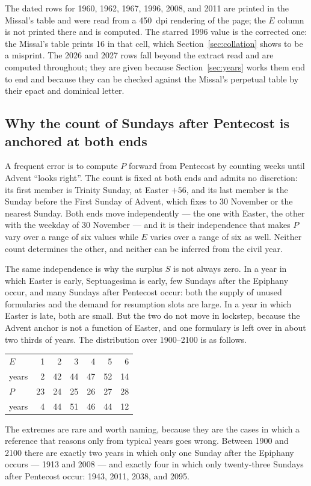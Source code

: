 The dated rows for 1960, 1962, 1967, 1996, 2008, and 2011 are printed in the Missal's table and
were read from a 450~dpi rendering of the page; the $E$ column is not printed there and is
computed. The starred 1996 value is the corrected one: the Missal's table prints 16 in that
cell, which Section~\ref{sec:collation} shows to be a misprint. The 2026 and 2027 rows fall beyond the extract read and are computed throughout; they
are given because Section~\ref{sec:years} works them end to end and because they can be checked
against the Missal's perpetual table by their epact and dominical letter.

\subsection{Why the count of Sundays after Pentecost is anchored at both ends}

A frequent error is to compute $P$ forward from Pentecost by counting weeks until Advent
``looks right''. The count is fixed at both ends and admits no discretion: its first member is
Trinity Sunday, at Easter $+56$, and its last member is the Sunday before the First Sunday of
Advent, which  fixes to 30 November or the nearest Sunday. Both ends move
independently — the one with Easter, the other with the weekday of 30 November — and it is
their independence that makes $P$ vary over a range of six values while $E$ varies over a range
of six as well. Neither count determines the other, and neither can be inferred from the civil
year.

The same independence is why the surplus $S$ is not always zero. In a year in which Easter is
early, Septuagesima is early, few Sundays after the Epiphany occur, and many Sundays after
Pentecost occur: both the supply of unused formularies and the demand for resumption slots are
large. In a year in which Easter is late, both are small. But the two do not move in lockstep,
because the Advent anchor is not a function of Easter, and one formulary is left over in about
two thirds of years. The distribution over 1900--2100 is as follows.

\begin{center}
\small
\begin{tabular}{@{}l r r r r r r@{}}
\toprule
$E$ & 1 & 2 & 3 & 4 & 5 & 6 \\
years & 2 & 42 & 44 & 47 & 52 & 14 \\
\midrule
$P$ & 23 & 24 & 25 & 26 & 27 & 28 \\
years & 4 & 44 & 51 & 46 & 44 & 12 \\
\bottomrule
\end{tabular}
\end{center}

The extremes are rare and worth naming, because they are the cases in which a reference that
reasons only from typical years goes wrong. Between 1900 and 2100 there are exactly two years
in which only one Sunday after the Epiphany occurs — 1913 and 2008 — and exactly four in which
only twenty-three Sundays after Pentecost occur: 1943, 2011, 2038, and 2095.
